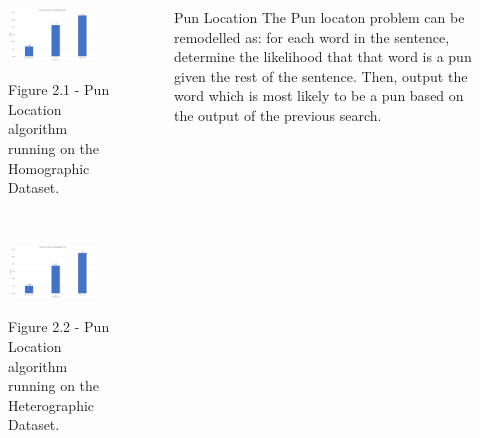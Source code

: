 \documentclass[final]{beamer}
\newlength{\onecolwid}
\newlength{\twocolwid}
\begin{document}
\begin{frame}[t]
\begin{columns}[t]
\begin{column}{\twocolwid}
\begin{columns}[t,totalwidth=\twocolwid]
\begin{column}{\onecolwid}
					\begin{figure}
					\includegraphics[width=0.85\textwidth]{HomographicLocation.png}\\
					\caption{Figure 2.1 - Pun Location algorithm running on the Homographic Dataset.}
					\end{figure}
					\\
					\vspace{20mm}
					\begin{figure}
					\includegraphics[width=0.85\textwidth]{HeterographicLocation.png}\\
					\caption{Figure 2.2 - Pun Location algorithm running on the Heterographic Dataset.}
					\end{figure}
				\end{column} %
				\begin{column}{\onecolwid}
					\vspace{20mm}
					\begin{block}{Pun Location}
						{\large 
							The Pun locaton problem can be remodelled as: for each word in the sentence, determine the likelihood that that word is a pun given the rest of the sentence. Then, output the word which is most likely to be a pun based on the output of the previous search. \\
}
\end{block}
\end{column}
\end{columns}
\end{column}
\end{columns}
\end{frame}
\end{document}

